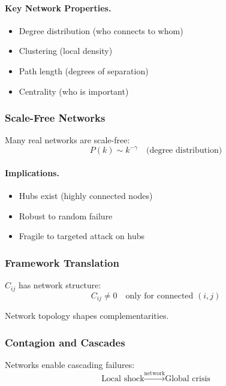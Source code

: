 \paragraph{Key Network Properties.}
\begin{itemize}
    \item Degree distribution (who connects to whom)
    \item Clustering (local density)
    \item Path length (degrees of separation)
    \item Centrality (who is important)
\end{itemize}

\subsubsection{Scale-Free Networks}

Many real networks are scale-free:
\begin{equation}
P(k) \sim k^{-\gamma} \quad \text{(degree distribution)}
\end{equation}

\paragraph{Implications.}
\begin{itemize}
    \item Hubs exist (highly connected nodes)
    \item Robust to random failure
    \item Fragile to targeted attack on hubs
\end{itemize}

\subsubsection{Framework Translation}

$C_{ij}$ has network structure:
\begin{equation}
C_{ij} \neq 0 \quad \text{only for connected } (i,j)
\end{equation}

Network topology shapes complementarities.

\subsubsection{Contagion and Cascades}

Networks enable cascading failures:
\begin{equation}
\text{Local shock} \xrightarrow{\text{network}} \text{Global crisis}
\end{equation}

